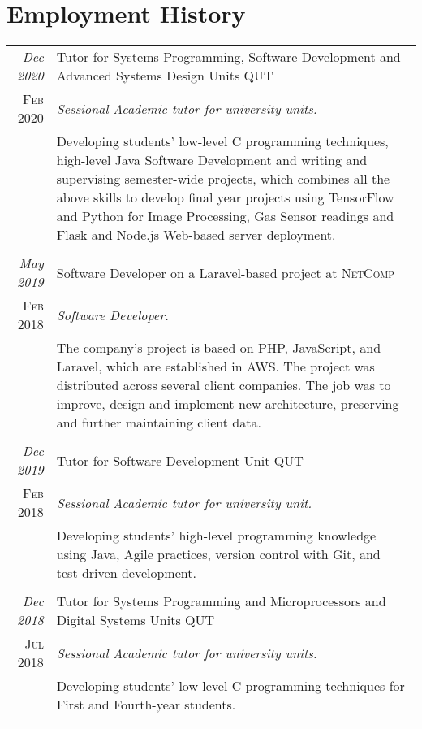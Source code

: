 \documentclass[a4paper,12pt]{article}
\begin{document}
\section{Employment History}
\begin{tabular}{r|p{11cm}}
    \emph{Dec 2020} &Tutor for Systems Programming, Software Development and Advanced Systems Design Units \textsc{QUT} \\\textsc{Feb 2020}&\emph{Sessional Academic tutor for university units.}\\&\footnotesize{Developing students' low-level C programming techniques, high-level Java Software Development and writing and supervising semester-wide projects, which combines all the above skills to develop final year projects using TensorFlow and Python for Image Processing, Gas Sensor readings and Flask and Node.js Web-based server deployment.}\\\multicolumn{2}{c}{} \\ [1pc]
	
	\emph{May 2019} & Software Developer on a Laravel-based project at \textsc{NetComp} \\\textsc{Feb 2018}&\emph{Software Developer.}\\&\footnotesize{The company's project is based on PHP, JavaScript, and Laravel, which are established in AWS. The project was distributed across several client companies. The job was to improve, design and implement new architecture, preserving and further maintaining client data.}\\\multicolumn{2}{c}{} \\ [1pc]
	
	\emph{Dec 2019} &Tutor for Software Development Unit \textsc{QUT} \\\textsc{Feb 2018}&\emph{Sessional Academic tutor for university unit.}\\&\footnotesize{Developing students' high-level programming knowledge using Java, Agile practices, version control with Git, and test-driven development.}\\\multicolumn{2}{c}{} \\ [1pc]
	
	\emph{Dec 2018} &Tutor for Systems Programming and Microprocessors and Digital Systems Units \textsc{QUT} \\\textsc{Jul 2018}&\emph{Sessional Academic tutor for university units.}\\&\footnotesize{Developing students' low-level C programming techniques for First and Fourth-year students.}\\\multicolumn{2}{c}{} \\ [1pc]
	

\end{tabular}
\end{document}
